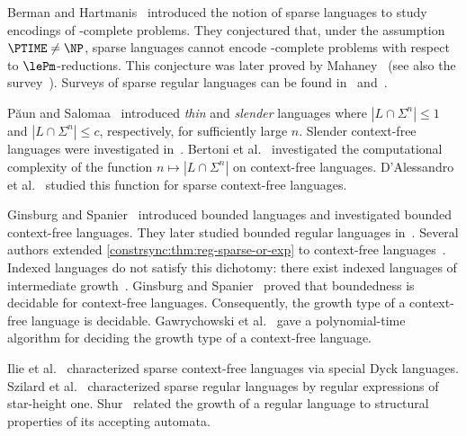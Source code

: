 Berman and Hartmanis~\cite{DBLP:journals/siamcomp/BermanH77}
introduced the notion of sparse languages to study encodings of \NP-complete problems.
They conjectured that, under the assumption $\PTIME \ne \NP$,
sparse languages cannot encode \NP-complete problems with respect to $\lePm$-reductions.
This conjecture was later proved by Mahaney~\cite{DBLP:journals/jcss/Mahaney82}
(see also the survey~\cite{DBLP:conf/mfcs/HartmanisM80}).
Surveys of sparse regular languages can be found
in~\cite[Chap.~2, Sect.~3.5]{DBLP:reference/hfl/Yu97}
and~\cite[Sect.~XII.4.2]{Pin2022}.

P\u{a}un and Salomaa~\cite{DBLP:journals/dam/PaunS95}
introduced \emph{thin} and \emph{slender}
languages where $|L \cap \Sigma^n| \le 1$ and $|L \cap \Sigma^n| \le c$, respectively,
for sufficiently large $n$.
Slender context-free languages were investigated in~\cite{DBLP:journals/tcs/Ilie94,DBLP:journals/tcs/Raz97}.
Bertoni et al.~\cite{DBLP:conf/stacs/BertoniGS87} investigated the computational complexity
of the function $n \mapsto |L \cap \Sigma^n|$
on context-free languages.
D'Alessandro et al.~\cite{DBLP:journals/tcs/DAlessandroIV06} studied this function for sparse context-free languages.

Ginsburg and Spanier~\cite{Ginsburg1964BOUNDEDAL}
introduced bounded languages and investigated bounded context-free languages.
They later studied bounded regular languages
in~\cite{GinsburgSpanier66}.
Several authors extended \cref{constrsync:thm:reg-sparse-or-exp}
to context-free languages~\cite{DBLP:journals/jcss/BridsonG02,DBLP:conf/stacs/IbarraR86,DBLP:journals/tcs/Incitti01,DBLP:journals/eik/LatteuxT84,DBLP:journals/tcs/Raz97,Trofimov81}.
Indexed languages do not satisfy this dichotomy: there
exist indexed languages of intermediate growth~\cite{DBLP:journals/tcs/GrigorchukM99}.
Ginsburg and Spanier~\cite[Thm.~5.2]{Ginsburg1964BOUNDEDAL}
proved that boundedness is decidable for context-free languages.
Consequently, the growth type of a context-free language is decidable.
Gawrychowski et al.~\cite{DBLP:journals/ijfcs/GawrychowskiKRS10}
gave a polynomial-time algorithm for deciding the growth type of a context-free language.

Ilie et al.~\cite{DBLP:journals/ita/IlieRS00}
characterized sparse context-free languages via special Dyck languages.
Szilard et al.~\cite[Cor.~1]{DBLP:conf/mfcs/SzilardYZS92}
characterized sparse regular languages by regular expressions of star-height one.
Shur~\cite{DBLP:conf/csr/Shur08}
related the growth of a regular language to structural properties of its accepting automata.

